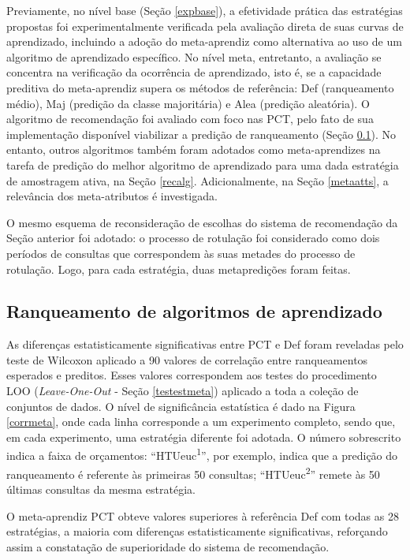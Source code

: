 Previamente, no nível base (Seção \ref{expbase}), a efetividade prática das estratégias propostas foi experimentalmente verificada pela avaliação direta de suas curvas de aprendizado, incluindo a adoção do meta-aprendiz como alternativa ao uso de um algoritmo de aprendizado específico.
No nível meta, entretanto, a avaliação se concentra na verificação da ocorrência de aprendizado, isto é, se a capacidade preditiva do meta-aprendiz supera os métodos de referência: Def (ranqueamento médio), Maj (predição da classe majoritária) e Alea (predição aleatória).
O algoritmo de recomendação foi avaliado com foco nas PCT, pelo fato de sua implementação disponível viabilizar a predição de ranqueamento (Seção \ref{rankalg}).
No entanto, outros algoritmos também foram adotados como meta-aprendizes na tarefa de predição do melhor algoritmo de aprendizado para uma dada estratégia de amostragem ativa, na Seção \ref{recalg}.
Adicionalmente, na Seção \ref{metaatts}, a relevância dos meta-atributos é investigada.

O mesmo esquema de reconsideração de escolhas do sistema de recomendação da Seção anterior foi adotado:
o processo de rotulação foi considerado como dois períodos de consultas que correspondem às suas metades do processo de rotulação.
Logo, para cada estratégia, duas metapredições foram feitas.

\subsection{Ranqueamento de algoritmos de aprendizado}\label{rankalg}
As diferenças estatisticamente significativas entre PCT e Def foram reveladas pelo teste de Wilcoxon aplicado a 90 valores de correlação entre ranqueamentos esperados e preditos.
Esses valores correspondem aos testes do procedimento LOO (\textit{Leave-One-Out} - Seção \ref{testestmeta}) aplicado a toda a coleção de conjuntos de dados.
O nível de significância estatística é dado na Figura \ref{corrmeta}, onde cada linha corresponde a um experimento completo, sendo que, em cada experimento, uma estratégia diferente foi adotada.
O número sobrescrito indica a faixa de orçamentos: ``HTUeuc\textsuperscript{1}'', por exemplo, indica que a predição do ranqueamento é referente às primeiras 50 consultas;
``HTUeuc\textsuperscript{2}'' remete às 50 últimas consultas da mesma estratégia.


O meta-aprendiz PCT obteve valores superiores à referência Def com todas as 28 estratégias, a maioria com diferenças estatisticamente significativas, reforçando assim a constatação de superioridade do sistema de recomendação.


